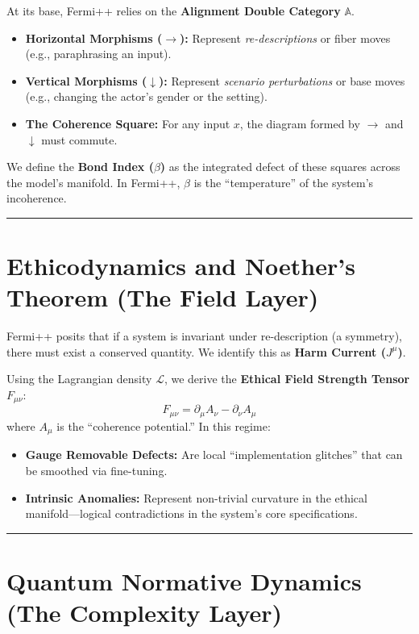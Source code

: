 \documentclass[12pt]{article}
\begin{document}
At its base, Fermi++ relies on the \textbf{Alignment Double Category} $\mathbb{A}$.

\begin{itemize}
    \item \textbf{Horizontal Morphisms ($\rightarrow$):} Represent \textit{re-descriptions} or fiber moves (e.g., paraphrasing an input).
    \item \textbf{Vertical Morphisms ($\downarrow$):} Represent \textit{scenario perturbations} or base moves (e.g., changing the actor's gender or the setting).
    \item \textbf{The Coherence Square:} For any input $x$, the diagram formed by $\rightarrow$ and $\downarrow$ must commute.
\end{itemize}

We define the \textbf{Bond Index ($\beta$)} as the integrated defect of these squares across the model's manifold. In Fermi++, $\beta$ is the ``temperature'' of the system's incoherence.

\bigskip
\hrule
\bigskip

\section{Ethicodynamics and Noether's Theorem (The Field Layer)}

Fermi++ posits that if a system is invariant under re-description (a symmetry), there must exist a conserved quantity. We identify this as \textbf{Harm Current ($J^\mu$)}.

Using the Lagrangian density $\mathcal{L}$, we derive the \textbf{Ethical Field Strength Tensor} $F_{\mu\nu}$:
\[
    F_{\mu\nu} = \partial_\mu A_\nu - \partial_\nu A_\mu
\]
where $A_\mu$ is the ``coherence potential.'' In this regime:

\begin{itemize}
    \item \textbf{Gauge Removable Defects:} Are local ``implementation glitches'' that can be smoothed via fine-tuning.
    \item \textbf{Intrinsic Anomalies:} Represent non-trivial curvature in the ethical manifold---logical contradictions in the system's core specifications.
\end{itemize}

\bigskip
\hrule
\bigskip

\section{Quantum Normative Dynamics (The Complexity Layer)}
\end{document}
